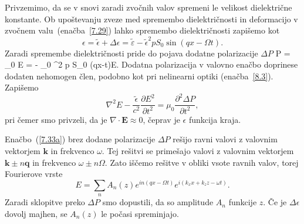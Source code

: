 Privzemimo, da se v snovi zaradi zvočnih valov spremeni le velikost
dielektrične konstante. Ob upoštevanju zveze med spremembo dielektričnosti in deformacijo
v zvočnem valu~(enačba~\ref{7.29}) lahko spremembo dielektričnosti
zapišemo kot  
\begin{equation}
\epsilon=\tilde{\epsilon}+\Delta\epsilon = 
\tilde{\varepsilon} -\tilde{\epsilon}^{2}pS_{0}\sin(qx-\Omega t).
\label{7.33}
\end{equation}
Zaradi spremembe dielektričnosti pride do pojava
dodatne polarizacije $\Delta P$
\beq
\Delta P = \varepsilon_0 \Delta \varepsilon E = - \varepsilon_0 
\tilde{\varepsilon}^2 p S_0 \sin(qx-\Omega t)E.
\eeq
Dodatna polarizacija v valovno enačbo doprinese dodaten nehomogen člen, podobno
kot pri nelinearni optiki (enačba~\ref{8.3}). Zapišemo
\begin{equation}
\nabla^{2}E-\frac{\tilde{\epsilon}}{c^{2}}{\frac{\partial E^{2}}
{\partial t^{2}}}=\mu_{0}{\frac{\partial^2 \Delta P}{\partial t^{2}}},
\label{7.33a}
\end{equation}
pri čemer smo privzeli, da je $\nabla\cdot\mathbf{E}\approx 0$, čeprav je
$\epsilon$ funkcija kraja. 

Enačbo~(\ref{7.33a}) brez dodane polarizacije $\Delta P$ rešijo ravni valovi 
z valovnim vektorjem $\mathbf{k}$ in frekvenco $\omega$. Tej rešitvi se 
primešajo valovi z valovnim vektorjem $\mathbf{k}\pm n\mathbf{q}$
in frekvenco $\omega\pm n\Omega$. Zato iščemo rešitve v obliki vsote
ravnih valov, torej Fourierove vrste
\begin{equation}
E=\sum_{n}A_{n}(z)e^{in(qx-\Omega t)}e^{i(k_{x}x+k_{z}z-\omega t)}.
\label{7.34}
\end{equation}
Zaradi sklopitve preko $\Delta P$ smo dopustili, da so amplitude
$A_{n}$ funkcije $z$. Če je $\Delta\epsilon$ dovolj majhen, se $A_{n}(z)$
le počasi spreminjajo.

